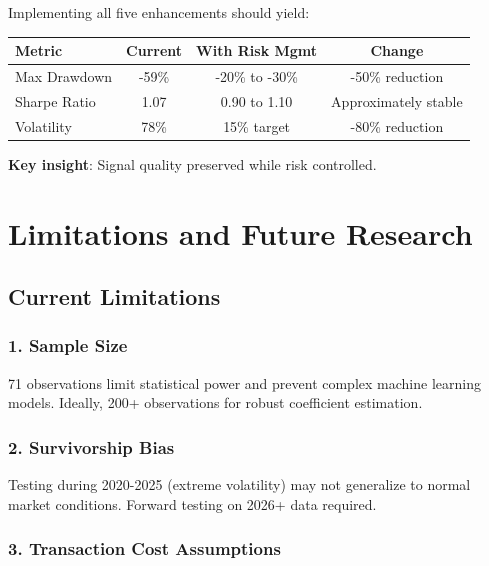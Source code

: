 \documentclass[12pt,a4paper]{article}
\begin{document}
Implementing all five enhancements should yield:

\begin{table}[H]
\centering
\begin{tabular}{@{}lccc@{}}
\toprule
\textbf{Metric} & \textbf{Current} & \textbf{With Risk Mgmt} & \textbf{Change} \\
\midrule
Max Drawdown & -59\% & -20\% to -30\% & -50\% reduction \\
Sharpe Ratio & 1.07 & 0.90 to 1.10 & Approximately stable \\
Volatility & 78\% & 15\% target & -80\% reduction \\
\bottomrule
\end{tabular}
\end{table}

\textbf{Key insight}: Signal quality preserved while risk controlled.

\newpage
\section{Limitations and Future Research}

\subsection{Current Limitations}

\subsubsection{1. Sample Size}

71 observations limit statistical power and prevent complex machine learning models. Ideally, 200+ observations for robust coefficient estimation.

\subsubsection{2. Survivorship Bias}

Testing during 2020-2025 (extreme volatility) may not generalize to normal market conditions. Forward testing on 2026+ data required.

\subsubsection{3. Transaction Cost Assumptions}
\end{document}
